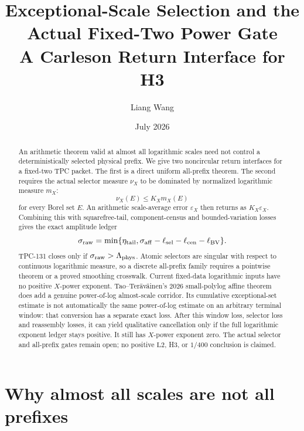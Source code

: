 \documentclass[11pt]{article}
\title{\textbf{Exceptional-Scale Selection and the Actual
Fixed-Two Power Gate}\\
\large A Carleson Return Interface for H3}
\author{Liang Wang}
\date{July 2026}
\theoremstyle{definition}
\theoremstyle{remark}
\newcommand{\Ltwo}{\mathrm{L2}}
\begin{document}
\maketitle

\begin{abstract}
An arithmetic theorem valid at almost all logarithmic scales need
not control a deterministically selected physical prefix.  We give
two noncircular return interfaces for a fixed-two TPC packet.  The
first is a direct uniform all-prefix theorem.  The second requires
the actual selector measure \(\nu_X\) to be dominated by normalized
logarithmic measure \(m_X\):
\[
 \nu_X(E)\le K_Xm_X(E)
\]
for every Borel set \(E\).  An arithmetic scale-average error
\(\varepsilon_X\) then returns as \(K_X\varepsilon_X\).  Combining
this with squarefree-tail, component-census and bounded-variation
losses gives the exact amplitude ledger
\[
 \sigma_{\rm raw}
 =
 \min\{\eta_{\rm tail},
 \sigma_{\rm aff}-\ell_{\rm sel}-\ell_{\rm cen}-\ell_{\rm BV}\}.
\]
TPC-131 closes only if
\(\sigma_{\rm raw}>\Lambda_{\rm phys}\).  Atomic selectors are
singular with respect to continuous logarithmic measure, so a
discrete all-prefix family requires a pointwise theorem or a proved
smoothing crosswalk.  Current fixed-data logarithmic inputs have no
positive \(X\)-power exponent.  Tao--Ter\"av\"ainen's 2026
small-polylog affine theorem does add a genuine power-of-log
almost-scale corridor.  Its cumulative exceptional-set estimate is
not automatically the same power-of-log estimate on an arbitrary
terminal window: that conversion has a separate exact loss.  After
this window loss, selector loss and reassembly losses, it can yield
qualitative cancellation only if the full logarithmic exponent
ledger stays positive.  It still has \(X\)-power exponent zero.
The actual selector and all-prefix gates remain open; no positive
\(\Ltwo\), H3, or \(1/400\) conclusion is claimed.
\end{abstract}

\section{Why almost all scales are not all prefixes}
\end{document}
